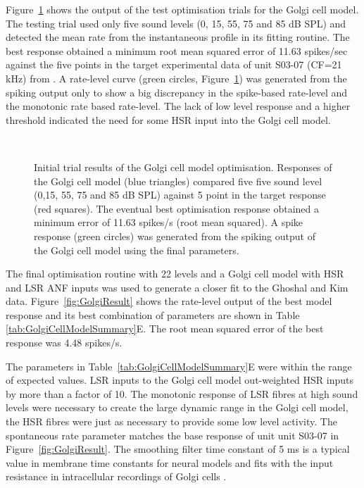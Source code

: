  Figure~\ref{fig:GolgiTestResult} shows the output of the test
 optimisation trials for the Golgi cell model.  The testing trial used
 only five sound levels (0, 15, 55, 75 and 85 dB SPL) and detected the
 mean rate from the instantaneous profile in its fitting routine. The
 best response obtained a minimum root mean
 squared error of 11.63 spikes/sec against the five points in the target experimental  data of unit S03-07 (CF=21 kHz) from \citep{GhoshalKim:1996}. A
 rate-level curve (green circles, Figure~\ref{fig:GolgiTestResult})
 was generated from the spiking output only to show a big discrepancy
 in the spike-based rate-level and the monotonic rate based
 rate-level. The lack of low level response and a higher threshold
 indicated the need for some HSR input into the Golgi cell model.

\smallskip{}


\begin{figure}[htb]
  \centering
  \\
  \caption{Initial trial results of the Golgi cell model optimisation.
    Responses of the Golgi cell model (blue triangles) compared five five sound
    level (0,15, 55, 75 and 85 dB SPL) against 5 point in the target response
    (red squares). The eventual best optimisation response obtained a minimum
    error of 11.63 spikes/s (root mean squared). A spike response (green
    circles) was generated from the spiking output of the Golgi cell model using
    the final parameters.  }\label{fig:GolgiTestResult}
\end{figure}

The final optimisation routine with 22 levels and a Golgi cell model with HSR
and LSR ANF inputs was used to generate a closer fit to the Ghoshal and Kim
data. Figure~\ref{fig:GolgiResult} shows the rate-level output of the best model
response and its best combination of parameters are shown in Table
\ref{tab:GolgiCellModelSummary}E. The root mean squared error of the best
response was 4.48 spikes/s.

The parameters in Table~\ref{tab:GolgiCellModelSummary}E were within
the range of expected values. LSR inputs to the Golgi cell model
out-weighted HSR inputs by more than a factor of 10. The monotonic
response of LSR fibres at high sound levels were necessary to create
the large dynamic range in the Golgi cell model, the HSR fibres were
just as necessary to provide some low level activity. The spontaneous
rate parameter matches the base response of unit unit S03-07 in
Figure~\ref{fig:GolgiResult}. The smoothing filter time constant of 5
ms is a typical value in membrane time constants for neural models and
fits with the input resistance in intracellular recordings of Golgi
cells \citep{FerragamoGoldingEtAl:1998}.  

